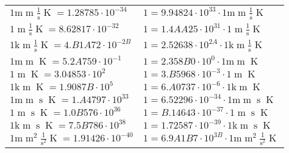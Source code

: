\begin{center}
\begin{longtable}{l l}
{\color{gray}$1 \bm{\mathrm{ m}}{\operatorname{m}}\frac1{\operatorname{s}}{}{\operatorname{K}} = 1.28785\cdot10^{-34} $}   & {\color{gray}$ 1 = 9.94824\cdot10^{33} \cdot 1 \bm{\mathrm{ m}}{\operatorname{m}}\frac1{\operatorname{s}}{}{\operatorname{K}}$}  \\
{\color{black}$1 \bm{\mathrm{ }}{\operatorname{m}}\frac1{\operatorname{s}}{}{\operatorname{K}} = 8.62817\cdot10^{-32} $}   & {\color{black}$ 1 = 1.4AA25\cdot10^{31} \cdot 1 \bm{\mathrm{ }}{\operatorname{m}}\frac1{\operatorname{s}}{}{\operatorname{K}}$}  \\
{\color{gray}$1 \bm{\mathrm{ k}}{\operatorname{m}}\frac1{\operatorname{s}}{}{\operatorname{K}} = 4.B1A72\cdot10^{-2B} $}   & {\color{gray}$ 1 = 2.52638\cdot10^{2A} \cdot 1 \bm{\mathrm{ k}}{\operatorname{m}}\frac1{\operatorname{s}}{}{\operatorname{K}}$}  \\
{\color{gray}$1 \bm{\mathrm{ m}}{\operatorname{m}}{}{}{\operatorname{K}} = 5.2A759\cdot10^{-1} $}   & {\color{gray}$ 1 = 2.358B0\cdot10^{0} \cdot 1 \bm{\mathrm{ m}}{\operatorname{m}}{}{}{\operatorname{K}}$}  \\
{\color{black}$1 \bm{\mathrm{ }}{\operatorname{m}}{}{}{\operatorname{K}} = 3.04853\cdot10^{2} $}   & {\color{black}$ 1 = 3.B5968\cdot10^{-3} \cdot 1 \bm{\mathrm{ }}{\operatorname{m}}{}{}{\operatorname{K}}$}  \\
{\color{gray}$1 \bm{\mathrm{ k}}{\operatorname{m}}{}{}{\operatorname{K}} = 1.9087B\cdot10^{5} $}   & {\color{gray}$ 1 = 6.A0737\cdot10^{-6} \cdot 1 \bm{\mathrm{ k}}{\operatorname{m}}{}{}{\operatorname{K}}$}  \\
{\color{gray}$1 \bm{\mathrm{ m}}{\operatorname{m}}{\operatorname{s}}{}{\operatorname{K}} = 1.A4797\cdot10^{33} $}   & {\color{gray}$ 1 = 6.52296\cdot10^{-34} \cdot 1 \bm{\mathrm{ m}}{\operatorname{m}}{\operatorname{s}}{}{\operatorname{K}}$}  \\
{\color{black}$1 \bm{\mathrm{ }}{\operatorname{m}}{\operatorname{s}}{}{\operatorname{K}} = 1.0B576\cdot10^{36} $}   & {\color{black}$ 1 = B.14643\cdot10^{-37} \cdot 1 \bm{\mathrm{ }}{\operatorname{m}}{\operatorname{s}}{}{\operatorname{K}}$}  \\
{\color{gray}$1 \bm{\mathrm{ k}}{\operatorname{m}}{\operatorname{s}}{}{\operatorname{K}} = 7.5B786\cdot10^{38} $}   & {\color{gray}$ 1 = 1.72587\cdot10^{-39} \cdot 1 \bm{\mathrm{ k}}{\operatorname{m}}{\operatorname{s}}{}{\operatorname{K}}$}  \\
{\color{gray}$1 \bm{\mathrm{ m}}{\operatorname{m}^2}\frac1{\operatorname{s}^2}{}{\operatorname{K}} = 1.91426\cdot10^{-40} $}   & {\color{gray}$ 1 = 6.9A1B7\cdot10^{3B} \cdot 1 \bm{\mathrm{ m}}{\operatorname{m}^2}\frac1{\operatorname{s}^2}{}{\operatorname{K}}$}  \\

\end{longtable}
\end{center}
